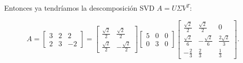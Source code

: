 \begin{frame}
\begin{solution}
		Entonces ya tendríamos la descomposición SVD $A=U\Sigma V^{T}$:

		\begin{equation*}
			A=
			\begin{bmatrix}
				3 & 2 & 2  \\
				2 & 3 & -2
			\end{bmatrix}=
			\begin{bmatrix}
				\frac{\sqrt{2}}{2} & \frac{\sqrt{2}}{2}  \\
				\frac{\sqrt{2}}{2} & -\frac{\sqrt{2}}{2}
			\end{bmatrix}
			\begin{bmatrix}
				5 & 0 & 0 \\
				0 & 3 & 0
			\end{bmatrix}
			\begin{bmatrix}
				\frac{\sqrt{2}}{2} & \frac{\sqrt{2}}{2}  & 0                   \\
				\frac{\sqrt{2}}{6} & -\frac{\sqrt{2}}{6} & \frac{2\sqrt{2}}{3} \\
				-\frac{2}{3}       & \frac{2}{3}         & \frac{1}{3}
			\end{bmatrix}.
		\end{equation*}
	\end{solution}
\end{frame}